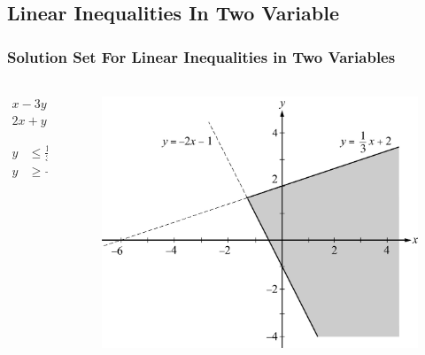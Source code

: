 \documentclass[
	11pt, %
	handout,
]{beamer}
\begin{document}
\subsection{Linear Inequalities In Two Variable}


	\begin{frame}
	\frametitle{Solution Set For Linear Inequalities in Two Variables}
	\framesubtitle{}
	\begin{columns}[t] 
		\begin{column}{0.3\textwidth} %
		\begin{equation*}
			\begin{aligned}
				x - 3y &\geq -6 \\
				2x + y &=\geq -1
			\end{aligned}
		\end{equation*}

		\bigskip
		\begin{equation*}
			\begin{aligned}
				y &\leq \frac{1}{3} + 2\\
				y &\geq -2x + 1
			\end{aligned}
		\end{equation*}

		\end{column}
		\begin{column}{0.7\textwidth} %
			\begin{figure}
				\includegraphics[width=0.8\linewidth]{Linear_Inequalities_In_Two_Variable.jpg} 
			\end{figure}
    \end{column}
	\end{columns}	
\end{frame}
\end{document}
